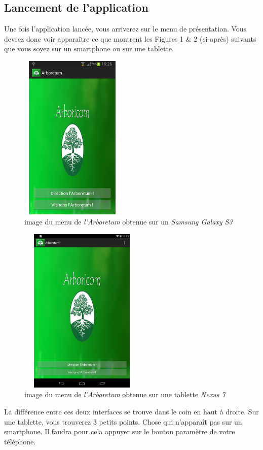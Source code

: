 \documentclass[a4paper,11pt]{article}
\begin{document}
    \subsection{Lancement de l'application}
    Une fois l'application lancée, vous arriverez sur le menu de présentation. Vous devrez donc voir apparaître ce que montrent les Figures 1 \& 2 (ci-après)
suivants que vous soyez sur un smartphone ou sur une tablette.
    \begin{figure}[H]
     \begin{center}
      \includegraphics[width=5cm,height=8cm]{menu.png}
      \caption{image du menu de \textit{l’Arboretum} obtenue sur un \textit{Samsung Galaxy S3}}
     \end{center}
    \end{figure}
    \begin{figure}[H]
     \begin{center}
      \includegraphics[width=6cm,height=8cm]{menuTablette.png}
      \caption{image du menu de \textit{l’Arboretum} obtenue sur une tablette \textit{Nexus 7}}
     \end{center}
    \end{figure}
    La différence entre ces deux interfaces se trouve dans le coin en haut à droite. Sur une tablette, vous trouverez 3 petits points. Chose qui
    n'apparaît pas sur un smartphone. Il faudra pour cela appuyer sur le bouton paramètre de votre téléphone.
    
\end{document}
